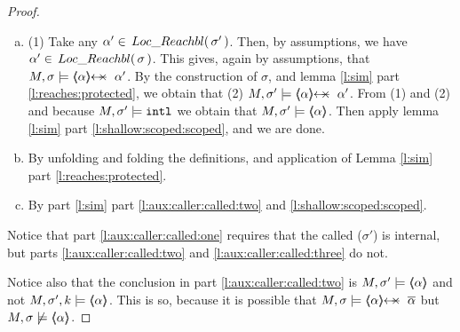 \begin{proof} $ ~ $ %

\begin{enumerate}[a.]
 
\item
(1) Take any $\alpha'\in \,Loc\_Reachbl(\,\sigma'\,)$. 
Then, by assumptions, we have   $\alpha'\in \,Loc\_Reachbl(\,\sigma\,)$. 
This gives, again by assumptions, that $M, \sigma \models {\protectedFrom {\alpha} {\alpha'}}$. 
By the construction of $\sigma$, and lemma \ref{l:sim} part \ref{l:reaches:protected}, we obtain that (2)  $M, \sigma' \models {\protectedFrom {\alpha} {\alpha'}}$.  
From (1) and (2) and because $M, \sigma' \models \mbox{\normalfont{\texttt{intl}}}$ we obtain that $M, \sigma' \models {\ensuremath{\langle\!\!\langle \alpha \rangle\!\!\rangle}}$. 
Then apply lemma \ref{l:sim} part \ref{l:shallow:scoped:scoped}, and we are done.
 
\item 
By  unfolding and folding the definitions, and application of Lemma \ref{l:sim} part \ref{l:reaches:protected}.
\item
By part   \ref{l:sim} part \ref{l:aux:caller:called:two} and \ref{l:shallow:scoped:scoped}.
\end{enumerate}

Notice that   part  \ref{l:aux:caller:called:one} requires that the called ($\sigma'$) is internal, but   parts  \ref{l:aux:caller:called:two} and  \ref{l:aux:caller:called:three} do not.

Notice also that the conclusion in part  \ref{l:aux:caller:called:two} is  $ M,  {\sigma'} \models   {\ensuremath{\langle\!\!\langle \alpha \rangle\!\!\rangle}}$  and not $ M,\sigma' ,{k} \models {\ensuremath{\langle\!\!\langle \alpha \rangle\!\!\rangle}} $.
 This is so, because it is possible that $ M, \sigma \models    {\protectedFrom {\alpha} {\overline {\alpha}}}$ but $ M, \sigma \not\models    {\ensuremath{\langle\!\!\langle \alpha \rangle\!\!\rangle}}$. 

\end{proof}


